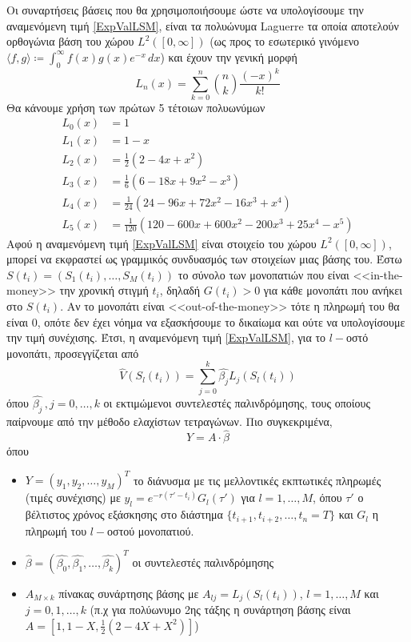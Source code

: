 \documentclass[12pt,a4paper,twoside,openany]{book}
\begin{document}
 	 Οι συναρτήσεις βάσεις που θα χρησιμοποιήσουμε ώστε να υπολογίσουμε την αναμενόμενη τιμή \ref{ExpValLSM}, είναι τα πολυώνυμα Laguerre τα οποία αποτελούν ορθογώνια βάση του χώρου $L^2([0,\infty])$ (ως προς το εσωτερικό γινόμενο $\langle f, g \rangle \coloneqq \int_{0}^{\infty} f(x)g(x)e^{-x} \, dx$) και έχουν την γενική μορφή 
 	 \[L_n(x)=\sum_{k=0}^{n}\binom{n}{k}\frac{(-x)^k}{k!} \]
 	 Θα κάνουμε χρήση των πρώτων 5 τέτοιων πολυωνύμων 
 	 \begin{align*}
 	 	L_0(x)&=1\\
 	 	L_1(x)&=1-x\\
 	 	L_2(x)&= \frac{1}{2}\left(2-4x+x^2\right)\\
 	 	L_3(x)&= \frac{1}{6}\left(6-18x+9x^2-x^3\right)\\
 	 	L_4(x)&= \frac{1}{24}\left(24-96x+72x^2-16x^3+x^4\right)\\
 	 	L_5(x)&= \frac{1}{120}\left(120-600x+600x^2-200x^3+25x^4-x^5\right)
 	 \end{align*}
	Αφού η αναμενόμενη τιμή \ref{ExpValLSM} είναι στοιχείο του χώρου $L^2([0,\infty])$, μπορεί να εκφραστεί ως γραμμικός συνδυασμός των στοιχείων μιας βάσης του. Έστω $S(t_i)=(S_1(t_i),\dots,S_M(t_i))$ το σύνολο των μονοπατιών που είναι <<in-the-money>> την χρονική στιγμή $t_i$, δηλαδή $G(t_i)>0$ για κάθε μονοπάτι που ανήκει στο $S(t_i)$. Αν το μονοπάτι είναι <<out-of-the-money>> τότε η πληρωμή του θα είναι 0, οπότε δεν έχει νόημα να εξασκήσουμε το δικαίωμα και ούτε να υπολογίσουμε την τιμή συνέχισης. Έτσι, η αναμενόμενη τιμή \ref{ExpValLSM}, για το $l-$οστό μονοπάτι, προσεγγίζεται από
	\[\widehat{V}(S_l(t_i))= \sum_{j=0}^{k}\hat{\beta_j}L_j(S_l(t_i)) \]
	όπου $\hat{\beta_j}\,,j=0,\dots,k$ οι εκτιμώμενοι συντελεστές παλινδρόμησης, τους οποίους παίρνουμε από την μέθοδο ελαχίστων τετραγώνων. Πιο συγκεκριμένα,
	\[Y=Α\cdot \hat{\beta}\]
	όπου
	\begin{itemize}
		\item $Y=(y_1,y_2,\dots,y_M)^T$ το διάνυσμα με τις μελλοντικές εκπτωτικές πληρωμές (τιμές συνέχισης) με $y_l=e^{-r(\tau'-t_i)}G_l(\tau')$ για $l=1,\dots,M$, όπου $\tau'$ ο βέλτιστος χρόνος εξάσκησης στο διάστημα $\{t_{i+1}, t_{i+2},\dots,t_n=T\}$ και $G_l$ η πληρωμή του $l-$οστού μονοπατιού.
		\item $\hat{\beta}=(\hat{\beta_0},\hat{\beta_1},\dots,\hat{\beta_k})^T$ οι συντελεστές παλινδρόμησης
		\item $Α_{M\times k}$ πίνακας συνάρτησης βάσης με $A_{lj}=L_j(S_l(t_i))$, $l=1,\dots,M$ και $j=0,1,\dots,k$ (π.χ για πολύωνυμο 2ης τάξης η συνάρτηση βάσης είναι $Α=[1, 1-X, \frac{1}{2}\left(2-4X+X^2\right)]$)
	\end{itemize}
\end{document}
